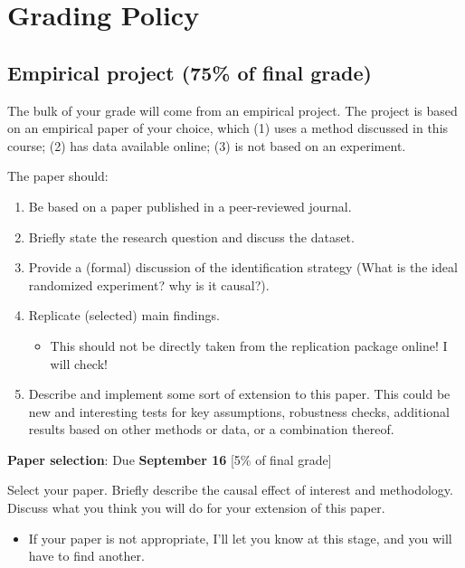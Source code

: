 \documentclass[11 pt]{article}
\begin{document}
\section*{Grading Policy}

\subsection*{Empirical project (75\% of final grade)}

The bulk of your grade will come from an empirical project. 
The project is based on an empirical paper of your choice, which (1) uses a method discussed in this course; (2) has data available online; 
(3) is not based on an experiment. 

The paper should:
\begin{enumerate}
    \item Be based on a paper published in a peer-reviewed journal.
    \item Briefly state the research question and discuss the dataset.
    \item Provide a (formal) discussion of the identification strategy (What is the ideal randomized experiment? why is it causal?).
    \item Replicate (selected) main findings.
    \begin{itemize}
        \item This should not be directly taken from the replication package online! I will check!
    \end{itemize}
    \item Describe and implement some sort of extension to this paper. This could be new and interesting tests for key assumptions, robustness checks, additional results based on other methods or data, or a combination thereof.
\end{enumerate}

\textbf{Paper selection}: Due \textbf{September 16} [5\% of final grade]
\begin{blist}
\item Select your paper. Briefly describe the causal effect of interest and methodology. Discuss what you think you will do for your extension of this paper. 
\begin{itemize}
    \item If your paper is not appropriate, I'll let you know at this stage, and you will have to find another.
\end{itemize}
\end{blist}
\end{document}
